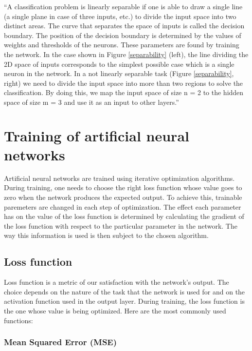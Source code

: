 \enquote{A classification problem is linearly separable if one is able to draw a single line (a single plane in case of three inputs, etc.) to divide the input space into two distinct areas. The curve that separates the space of inputs is called the decision boundary. The position of the decision boundary is determined by the values of weights and thresholds of the neurons. These parameters are found by training the network. In the case shown in Figure \ref{separability} (left), the line dividing the 2D space of inputs corresponds to the simplest possible case which is a single neuron in the network. In a not linearly separable task (Figure \ref{separability}, right) we need to divide the input space into more than two regions to solve the classification. By doing this, we map the input space of size n = 2 to the hidden space of size m = 3 and use it as an input to other layers.} \cite{mehlig}


\newpage

\section{Training of artificial neural networks}

Artificial neural networks are trained using iterative optimization algorithms. During training, one needs to choose the right loss function whose value goes to zero when the network produces the expected output. To achieve this, trainable paremeters are changed in each step of optimization. The effect each parameter has on the value of the loss function is determined by calculating the gradient of the loss function with respect to the particular parameter in the network. The way this information is used is then subject to the chosen algorithm. 

\subsection{Loss function}

Loss function is a metric of our satisfaction with the network's output. The choice depends on the nature of the task that the network is used for and on the activation function used in the output layer. During training, the loss function is the one whose value is being optimized. Here are the most commonly used functions:


\subsubsection{Mean Squared Error (MSE)}

